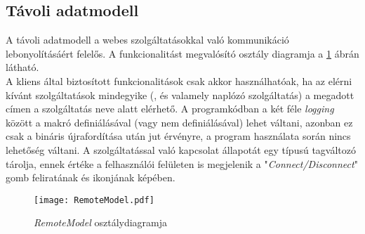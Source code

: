 \subsection{Távoli adatmodell}

A távoli adatmodell a webes szolgáltatásokkal való kommunikáció lebonyolításáért felelős. A funkcionalitást megvalósító osztály diagramja a \ref{fig:RemoteModel} ábrán látható. \\
A kliens által biztosított funkcionalitások csak akkor használhatóak, ha az elérni kívánt szolgáltatások mindegyike (,  és valamely naplózó szolgáltatás) a megadott címen a szolgáltatás neve alatt elérhető. A programkódban a két féle \emph{logging} között a  makró definiálásával (vagy nem definiálásával) lehet váltani, azonban ez csak a bináris újrafordítása után jut érvényre, a program használata során nincs lehetőség váltani. A szolgáltatással való kapcsolat állapotát egy  típusú tagváltozó tárolja, ennek értéke a felhasználói felületen is megjelenik a "\emph{Connect/Disconnect}" gomb feliratának és ikonjának képében. 
 
\begin{figure}[h]
\vspace{.5cm}
\texttt{[image: RemoteModel.pdf]}
\centering
\vspace{.2cm}
\caption{\emph{RemoteModel} osztálydiagramja}
\vspace{.5cm}
\label{fig:RemoteModel}
\end{figure}


